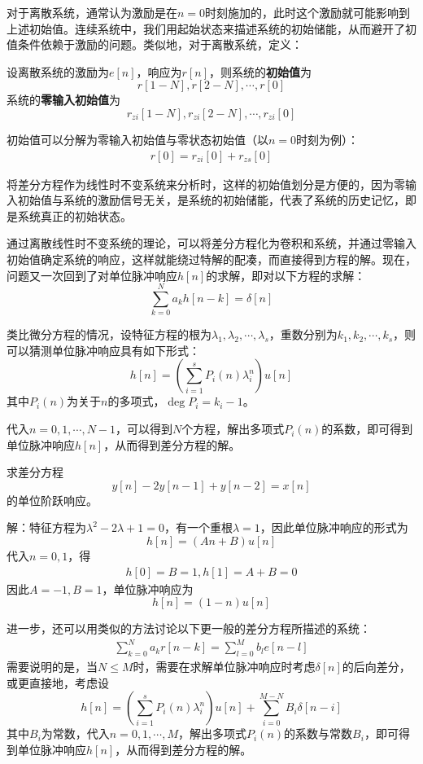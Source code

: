 \documentclass{ctexbook}
\begin{document}
对于离散系统，通常认为激励是在$n=0$时刻施加的，此时这个激励就可能影响到上述初始值。连续系统中，我们用起始状态来描述系统的初始储能，从而避开了初值条件依赖于激励的问题。类似地，对于离散系统，定义：
\begin{definition}[离散系统的初始值与零输入初始值]
    设离散系统的激励为$e[n]$，响应为$r[n]$，则系统的\textbf{初始值}为
    $$r[1-N],r[2-N],\cdots,r[0]$$
    系统的\textbf{零输入初始值}为
    $$r_{zi}[1-N],r_{zi}[2-N],\cdots,r_{zi}[0]$$
\end{definition}

初始值可以分解为零输入初始值与零状态初始值（以$n=0$时刻为例）：
\begin{align*}
    r[0]=r_{zi}[0]+r_{zs}[0]
\end{align*}

将差分方程作为线性时不变系统来分析时，这样的初始值划分是方便的，因为零输入初始值与系统的激励信号无关，是系统的初始储能，代表了系统的历史记忆，即是系统真正的初始状态。

通过离散线性时不变系统的理论，可以将差分方程化为卷积和系统，并通过零输入初始值确定系统的响应，这样就能绕过特解的配凑，而直接得到方程的解。现在，问题又一次回到了对单位脉冲响应$h[n]$的求解，即对以下方程的求解：
$$\sum_{k=0}^{N}a_k h[n-k] = \delta[n]$$

类比微分方程的情况，设特征方程的根为$\lambda_1,\lambda_2,\cdots,\lambda_s$，重数分别为$k_1,k_2,\cdots,k_s$，则可以猜测单位脉冲响应具有如下形式：
$$h[n]=\left(\sum_{i=1}^s P_i(n) \lambda_i^n \right)u[n]$$
其中$P_i(n)$为关于$n$的多项式，$\deg P_i=k_i-1$。

代入$n=0,1,\cdots,N-1$，可以得到$N$个方程，解出多项式$P_i(n)$的系数，即可得到单位脉冲响应$h[n]$，从而得到差分方程的解。

\begin{example}
    求差分方程
    $$y[n]-2y[n-1]+y[n-2]=x[n]$$
    的单位阶跃响应。

    解：特征方程为$\lambda^2-2\lambda+1=0$，有一个重根$\lambda=1$，因此单位脉冲响应的形式为
    $$h[n]=(A n+B)u[n]$$
    代入$n=0,1$，得\begin{align*}
    h[0]=B=1,h[1]=A+B=0
    \end{align*}
    因此$A=-1,B=1$，单位脉冲响应为
    $$h[n]=(1-n)u[n]$$
\end{example}

进一步，还可以用类似的方法讨论以下更一般的差分方程所描述的系统：
\begin{align*}
    \sum_{k=0}^{N}a_k r[n-k] = \sum_{l=0}^{M}b_l e[n-l]
\end{align*}
需要说明的是，当$N\leq M$时，需要在求解单位脉冲响应时考虑$\delta[n]$的后向差分，或更直接地，考虑设
$$h[n]=\left(\sum_{i=1}^s P_i(n) \lambda_i^n \right)u[n]+\sum_{i=0}^{M-N}B_i\delta[n-i]$$
其中$B_i$为常数，代入$n=0,1,\cdots,M$，解出多项式$P_i(n)$的系数与常数$B_i$，即可得到单位脉冲响应$h[n]$，从而得到差分方程的解。
\end{document}
